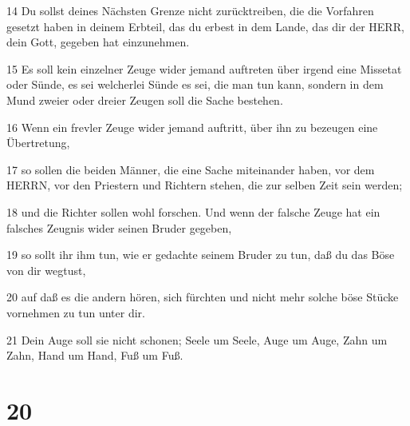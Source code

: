\par 14 Du sollst deines Nächsten Grenze nicht zurücktreiben, die die Vorfahren gesetzt haben in deinem Erbteil, das du erbest in dem Lande, das dir der HERR, dein Gott, gegeben hat einzunehmen.
\par 15 Es soll kein einzelner Zeuge wider jemand auftreten über irgend eine Missetat oder Sünde, es sei welcherlei Sünde es sei, die man tun kann, sondern in dem Mund zweier oder dreier Zeugen soll die Sache bestehen.
\par 16 Wenn ein frevler Zeuge wider jemand auftritt, über ihn zu bezeugen eine Übertretung,
\par 17 so sollen die beiden Männer, die eine Sache miteinander haben, vor dem HERRN, vor den Priestern und Richtern stehen, die zur selben Zeit sein werden;
\par 18 und die Richter sollen wohl forschen. Und wenn der falsche Zeuge hat ein falsches Zeugnis wider seinen Bruder gegeben,
\par 19 so sollt ihr ihm tun, wie er gedachte seinem Bruder zu tun, daß du das Böse von dir wegtust,
\par 20 auf daß es die andern hören, sich fürchten und nicht mehr solche böse Stücke vornehmen zu tun unter dir.
\par 21 Dein Auge soll sie nicht schonen; Seele um Seele, Auge um Auge, Zahn um Zahn, Hand um Hand, Fuß um Fuß.

\chapter{20}

